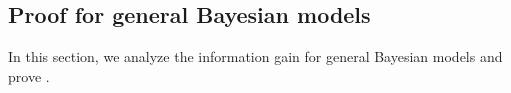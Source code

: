 \subsection{Proof for general Bayesian models}
In this section, we analyze the information gain for general Bayesian models and prove .
